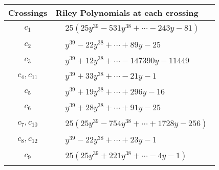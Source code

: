 \documentclass[1p]{elsarticle_modified}
\theoremstyle{definition}
\begin{document}
\begin{tabular}{m{50pt}|m{274pt}}
Crossings & \hspace{64pt}Riley Polynomials at each crossing \\
\hline $$\begin{aligned}c_{1}\end{aligned}$$&$\begin{aligned}
&25(25 y^{39}-531 y^{38}+\cdots-243 y-81)
\end{aligned}$\\
\hline $$\begin{aligned}c_{2}\end{aligned}$$&$\begin{aligned}
&y^{39}-22 y^{38}+\cdots+89 y-25
\end{aligned}$\\
\hline $$\begin{aligned}c_{3}\end{aligned}$$&$\begin{aligned}
&y^{39}+12 y^{38}+\cdots-147390 y-11449
\end{aligned}$\\
\hline $$\begin{aligned}c_{4},c_{11}\end{aligned}$$&$\begin{aligned}
&y^{39}+33 y^{38}+\cdots-21 y-1
\end{aligned}$\\
\hline $$\begin{aligned}c_{5}\end{aligned}$$&$\begin{aligned}
&y^{39}+19 y^{38}+\cdots+296 y-16
\end{aligned}$\\
\hline $$\begin{aligned}c_{6}\end{aligned}$$&$\begin{aligned}
&y^{39}+28 y^{38}+\cdots+91 y-25
\end{aligned}$\\
\hline $$\begin{aligned}c_{7},c_{10}\end{aligned}$$&$\begin{aligned}
&25(25 y^{39}-754 y^{38}+\cdots+1728 y-256)
\end{aligned}$\\
\hline $$\begin{aligned}c_{8},c_{12}\end{aligned}$$&$\begin{aligned}
&y^{39}-22 y^{38}+\cdots+23 y-1
\end{aligned}$\\
\hline $$\begin{aligned}c_{9}\end{aligned}$$&$\begin{aligned}
&25(25 y^{39}+221 y^{38}+\cdots-4 y-1)
\end{aligned}$\\
\hline
\end{tabular}\\~\\
\end{document}
